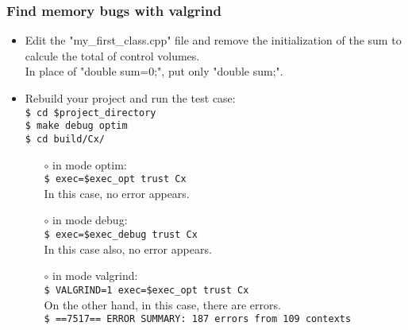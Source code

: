 \documentclass[10pt, hyperref={unicode=true,pdfusetitle, bookmarks=true,bookmarksnumbered=false,bookmarksopen=false, breaklinks=false,pdfborder={0 0 1},backref=true,colorlinks=true,linkcolor=darkblue,pageanchor, urlcolor=darkblue}]{beamer}
\begin{document}
\begin{frame}
\frametitle{Find memory bugs with valgrind}
\begin{block}{}

\begin{itemize}
\item Edit the "my\_first\_class.cpp" file and remove the initialization of the sum to calcule the total of control volumes.\\
In place of "double sum=0;", put only "double sum;".\\
\item Rebuild your project and run the test case:\\
\texttt{\$ cd \$project\_directory}\\
\texttt{\$ make debug optim}\\
\texttt{\$ cd build/Cx/}\\
    \begin{itemize}
    \item [$\circ$] in mode optim:\\
    \texttt{\$ exec=\$exec\_opt trust Cx}\\
In this case, no error appears.
    \item [$\circ$] in mode debug:\\
    \texttt{\$ exec=\$exec\_debug trust Cx}\\
In this case also, no error appears.
    \item [$\circ$] in mode valgrind:\\
    \texttt{\$ VALGRIND=1 exec=\$exec\_opt trust Cx}\\
On the other hand, in this case, there are errors.\\
    \texttt{\$ ==7517== ERROR SUMMARY: 187 errors from 109 contexts}
    \end{itemize}
\end{itemize}

\end{block}
\end{frame}
\end{document}
